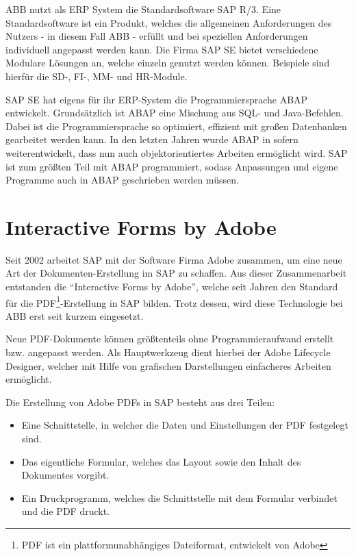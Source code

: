 ABB nutzt als \ac{ERP} System die Standardsoftware SAP R/3. Eine Standardsoftware ist ein Produkt, welches die allgemeinen Anforderungen des Nutzers - in diesem Fall ABB - erfüllt und bei speziellen Anforderungen individuell angepasst werden kann. Die Firma SAP SE bietet verschiedene Modulare Lösungen an, welche einzeln genutzt werden können. Beispiele sind hierfür die \ac{SD}-, \ac{FI}-, \ac{MM}- und \ac{HR}-Module. 

SAP SE hat eigens für ihr \ac{ERP}-System die Programmiersprache \ac{ABAP} entwickelt. Grundsätzlich ist \ac{ABAP} eine Mischung aus \ac{SQL}- und Java-Befehlen. Dabei ist  die Programmiersprache so optimiert, effizient mit großen Datenbanken gearbeitet werden kann. In den letzten Jahren wurde \ac{ABAP} in sofern weiterentwickelt, dass nun auch objektorientiertes Arbeiten ermöglicht wird. SAP ist zum größten Teil mit \ac{ABAP} programmiert, sodass Anpassungen und eigene Programme auch in \ac{ABAP} geschrieben werden müssen. 





\section{Interactive Forms by Adobe}

Seit 2002 arbeitet SAP mit der Software Firma Adobe zusammen, um eine neue Art der Dokumenten-Erstellung im SAP zu schaffen. Aus dieser Zusammenarbeit entstanden die "`Interactive Forms by Adobe"', welche seit Jahren den Standard für die PDF\footnote{\ac{PDF} ist ein plattformunabhängiges Dateiformat, entwickelt von Adobe}-Erstellung in SAP bilden. Trotz dessen, wird diese Technologie bei ABB erst seit kurzem eingesetzt.

Neue PDF-Dokumente können größtenteils ohne Programmieraufwand erstellt bzw. angepasst werden. Als Hauptwerkzeug dient hierbei der Adobe Lifecycle Designer, welcher mit Hilfe von grafischen Darstellungen einfacheres Arbeiten ermöglicht.

   

Die Erstellung von Adobe PDFs in SAP besteht aus drei Teilen:

\begin{itemize}
	\item Eine Schnittstelle, in welcher die Daten und Einstellungen der PDF festgelegt sind.
	\item Das eigentliche Formular, welches das Layout sowie den Inhalt des Dokumentes vorgibt.
	\item Ein Druckprogramm, welches die Schnittstelle mit dem Formular verbindet und die PDF druckt.
\end{itemize}

